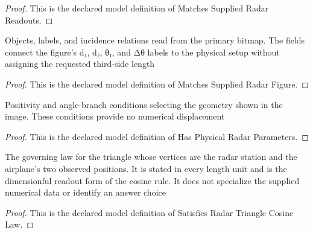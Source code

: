\begin{proof}
  This is the declared model definition of Matches Supplied Radar Readouts.
\end{proof}
\begin{definition}
  \label{def:physics:phyx-mini-0750:phyxminiproblems-problemphyxmini0750-matchessuppliedradarfigure}
  Objects, labels, and incidence relations read from the primary bitmap. The fields connect the figure's d₁, d₂, θ₁, and Δθ labels to the physical setup without assigning the requested third-side length
\end{definition}
\begin{proof}
  This is the declared model definition of Matches Supplied Radar Figure.
\end{proof}
\begin{definition}
  \label{def:physics:phyx-mini-0750:phyxminiproblems-problemphyxmini0750-hasphysicalradarparameters}
  Positivity and angle-branch conditions selecting the geometry shown in the image. These conditions provide no numerical displacement
\end{definition}
\begin{proof}
  This is the declared model definition of Has Physical Radar Parameters.
\end{proof}
\begin{definition}
  \label{def:physics:phyx-mini-0750:phyxminiproblems-problemphyxmini0750-satisfiesradartrianglecosinelaw}
  The governing law for the triangle whose vertices are the radar station and the airplane's two observed positions. It is stated in every length unit and is the dimensionful readout form of the cosine rule. It does not specialize the supplied numerical data or identify an answer choice
\end{definition}
\begin{proof}
  This is the declared model definition of Satisfies Radar Triangle Cosine Law.
\end{proof}
